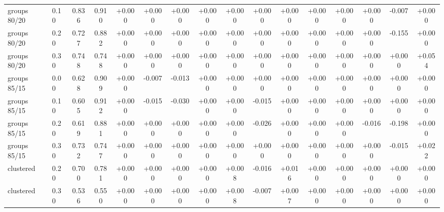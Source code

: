 \begin{table}[htbp]
{\begin{tabular}{llcccccccccccccc}
groups 80/20 & 0.10 & 0.836 & 0.910 & +0.000 & +0.000 & +0.000 & +0.000 & +0.000 & +0.000 & +0.000 & +0.000 & +0.000 & +0.000 & -0.007 & +0.000 \\
groups 80/20 & 0.20 & 0.727 & 0.882 & +0.000 & +0.000 & +0.000 & +0.000 & +0.000 & +0.000 & +0.000 & +0.000 & +0.000 & +0.000 & -0.155 & +0.000 \\
groups 80/20 & 0.30 & 0.748 & 0.748 & +0.000 & +0.000 & +0.000 & +0.000 & +0.000 & +0.000 & +0.000 & +0.000 & +0.000 & +0.000 & +0.000 & +0.054 \\
groups 85/15 & 0.00 & 0.628 & 0.909 & +0.000 & -0.007 & -0.013 & +0.000 & +0.000 & +0.000 & +0.000 & +0.000 & +0.000 & +0.000 & +0.000 & +0.000 \\
groups 85/15 & 0.10 & 0.605 & 0.912 & +0.000 & -0.015 & -0.030 & +0.000 & +0.000 & -0.015 & +0.000 & +0.000 & +0.000 & +0.000 & +0.000 & +0.000 \\
groups 85/15 & 0.20 & 0.619 & 0.881 & +0.000 & +0.000 & +0.000 & +0.000 & +0.000 & -0.026 & +0.000 & +0.000 & +0.000 & -0.016 & -0.198 & +0.000 \\
groups 85/15 & 0.30 & 0.732 & 0.747 & +0.000 & +0.000 & +0.000 & +0.000 & +0.000 & +0.000 & +0.000 & +0.000 & +0.000 & +0.000 & -0.015 & +0.022 \\
clustered & 0.20 & 0.700 & 0.781 & +0.000 & +0.000 & +0.000 & +0.000 & +0.008 & -0.016 & +0.016 & +0.000 & +0.000 & +0.000 & +0.000 & +0.000 \\
clustered & 0.30 & 0.536 & 0.550 & +0.000 & +0.000 & +0.000 & +0.000 & +0.008 & -0.007 & +0.007 & +0.000 & +0.000 & +0.000 & +0.000 & +0.000 \\
\bottomrule
\end{tabular}}
\end{table}